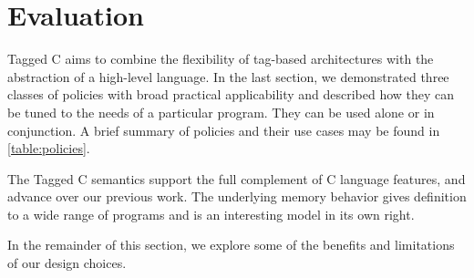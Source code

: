 \documentclass{llncs}
\begin{document}
\section{Evaluation}
\label{sec:evaluation}
\label{sec:limitations}

Tagged C aims to combine the flexibility of tag-based architectures with the abstraction
of a high-level language. In the last section, we demonstrated three classes of policies
with broad practical applicability and described how they can be tuned to the needs of a
particular program. They can be used alone or in conjunction. A brief summary of
policies and their use cases may be found in \cref{table:policies}.

The Tagged C semantics support the full complement of C language features, and advance
over our previous work. The underlying memory behavior gives definition to a wide range
of programs and is an interesting model in its own right.

In the remainder of this section, we explore some of the benefits and limitations of
our design choices.

  
\end{document}
